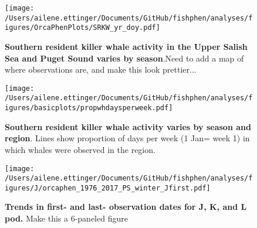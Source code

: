 \documentclass{article}
\begin{document}
\begin{figure}[p]
\texttt{[image: /Users/ailene.ettinger/Documents/GitHub/fishphen/analyses/figures/OrcaPhenPlots/SRKW\_yr\_doy.pdf]} 
\caption{\textbf{Southern resident killer whale activity in the Upper Salish Sea and Puget Sound varies by season}.Need to add a map of where observations are, and make this look prettier...}
 \label{fig:phenplot}
 \end{figure}
 
\begin{figure}[p]
\texttt{[image: /Users/ailene.ettinger/Documents/GitHub/fishphen/analyses/figures/basicplots/propwhdaysperweek.pdf]} 
\caption{\textbf{Southern resident killer whale activity varies by season and region}. Lines show proportion of days per week (1 Jan= week 1) in which whales were observed in the region.}
 \label{fig:phenplot2}
 \end{figure} 
 
\begin{figure}[p]
\texttt{[image: /Users/ailene.ettinger/Documents/GitHub/fishphen/analyses/figures/J/orcaphen\_1976\_2017\_PS\_winter\_Jfirst.pdf]} 
\caption{\textbf{Trends in first- and last- observation dates for J, K, and L pod.} Make this a 6-paneled figure}
 \label{fig:trends}
 \end{figure}


\end{document}
